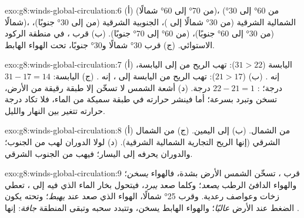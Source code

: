 \begin{solution}{exo:g8:winds-global-circulation:6}
(أ)  (من \ang{70} إلى \ang{60} شمالًا)،  (من \ang{60} إلى
\ang{30} شمالًا)،  الشمالية الشرقية (من \ang{30} شمالًا إلى )،
 الجنوبية الشرقية (من  إلى \ang{30} جنوبًا)،  (من \ang{30} إلى
\ang{60} جنوبًا)،  (من \ang{60} إلى \ang{70} جنوبًا). (ب) قرب ، في منطقة الركود الاستوائي. (ج) قرب \ang{30} شمالًا و\ang{30} جنوبًا، تحت
الهواء الهابط.
\end{solution}

\begin{solution}{exo:g8:winds-global-circulation:7}
(أ) اليابسة ($31 > 22$): تهب الريح من  إلى اليابسة، إنه . (ب)  ($21 > 17$): تهب الريح من اليابسة إلى ، إنه . (ج) اليابسة: $31 - 17 = 14$ درجة؛ : $22 -
21 = 1$ درجة. (د) أشعة الشمس لا تسخّن إلا طبقة رقيقة من الأرض،
تسخن وتبرد بسرعة؛ أما  فينشر حرارته في طبقة سميكة من الماء، فلا تكاد
درجة حرارته تتغير بين النهار والليل.
\end{solution}

\begin{solution}{exo:g8:winds-global-circulation:8}
(أ) من الشمال. (ب) إلى اليمين. (ج) من الشمال الشرقي (إنها الريح التجارية
الشمالية الشرقية). (د) لولا الدوران لهب من الجنوب؛ والدوران يحرفه إلى
اليسار؛ فيهب من الجنوب الشرقي.
\end{solution}

\begin{solution}{exo:g8:winds-global-circulation:9}
قرب ، تسخّن الشمس الأرض  بشدة، فالهواء \emph{يسخن}؛
والهواء الدافئ الرطب \emph{يصعد}؛ وكلما صعد \emph{يبرد}،
فيتحول بخار الماء الذي فيه إلى \emph{}، تعطي زخات وعواصف رعدية. وقرب
\ang{25} شمالًا، الهواء الذي صعد عند  \emph{يهبط}؛ وتحته يكون
الضغط عند الأرض \emph{عاليًا}؛ والهواء الهابط يسخن، وتتبدد سحبه
وتبقى المنطقة \emph{جافة}: إنها .
\end{solution}

